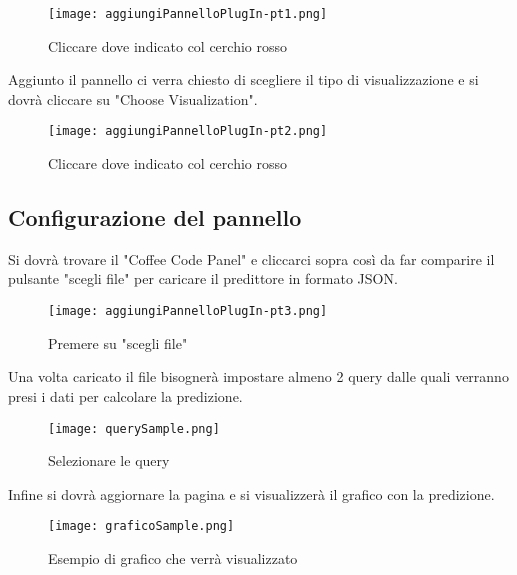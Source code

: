 \documentclass[../manuale-utente.tex]{subfiles}
\begin{document}
\begin{figure}[h!]
  \begin{center}
    \texttt{[image: aggiungiPannelloPlugIn-pt1.png]}\\
    \caption{Cliccare dove indicato col cerchio rosso}%
    \label{fig:aggiungi-pannello}
  \end{center}
\end{figure}

Aggiunto il pannello ci verra chiesto di scegliere il tipo di visualizzazione e si dovrà cliccare su "Choose Visualization".

\begin{figure}[h!]
  \begin{center}
    \texttt{[image: aggiungiPannelloPlugIn-pt2.png]}\\
    \caption{Cliccare dove indicato col cerchio rosso}%
    \label{fig:scegliere-la-visualizzazione}
  \end{center}
\end{figure}

\newpage
\subsection{Configurazione del pannello}

Si dovrà trovare il "Coffee Code Panel" e cliccarci sopra così da far comparire il pulsante "scegli file" per caricare il predittore in formato JSON.

\begin{figure}[h!]
    \begin{center}
      \texttt{[image: aggiungiPannelloPlugIn-pt3.png]}\\
      \caption{Premere su "scegli file"}%
      \label{fig:scelta-del-file}
    \end{center}
  \end{figure}

Una volta caricato il file bisognerà impostare almeno 2 query dalle quali verranno presi i dati per calcolare la predizione.

\begin{figure}[h!]
    \begin{center}
      \texttt{[image: querySample.png]}\\
      \caption{Selezionare le query}%
      \label{fig:selezionare-le-query}
    \end{center}
  \end{figure}
  \newpage
Infine si dovrà aggiornare la pagina e si visualizzerà il grafico con la predizione.

\begin{figure}[h!]
    \begin{center}
      \texttt{[image: graficoSample.png]}\\
      \caption{Esempio di grafico che verrà visualizzato}%
      \label{fig:esempio-grafico}
    \end{center}
  \end{figure}
\end{document}

